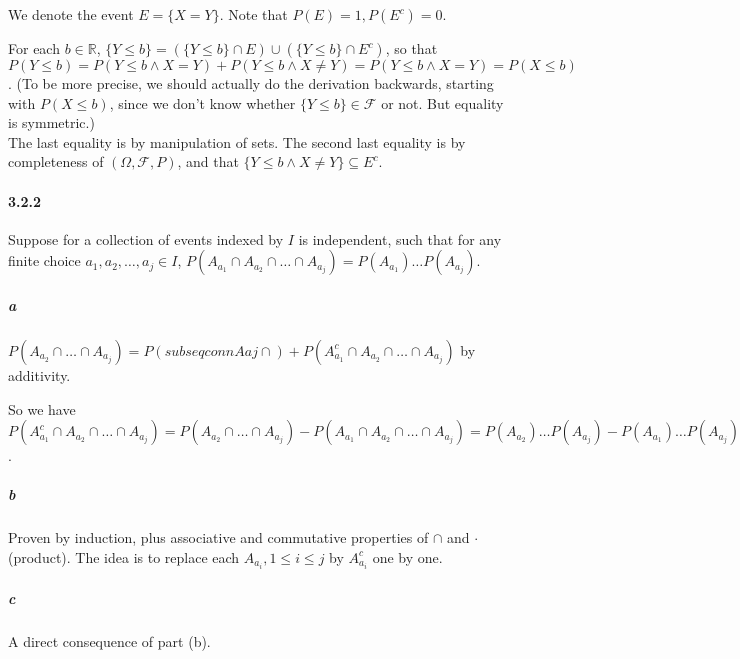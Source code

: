 \documentclass[a4paper]{article}
\newcommand{\alg}[0]{\mathcal{F}} %
\newcommand{\triple}[0]{(\Omega, \alg, P)} %
\newcommand{\real}[0]{\mathbb{R}} %
\newcommand{\seq}[2]{#1_1,#1_2,\dots,#1_{#2}} %
\newcommand{\subseqconn}[4]{#1_{#2_1} #4 #1_{#2_2} #4 \dots #4 #1_{#2_{#3}}} %
\begin{document}
We denote the event $E=\{X=Y\}$. Note that $P(E) = 1, P(E^c) = 0$.

For each $b\in\real$, $\{Y\leq b\} = (\{Y\leq b\}\cap E) \cup (\{Y\leq b\}\cap E^c)$, so that $P(Y\leq b) = P(Y\leq b\land X=Y) + P(Y\leq b\land X\neq Y) = P(Y\leq b\land X=Y) = P(X\leq b)$. (To be more precise, we should actually do the derivation backwards, starting with $P(X\leq b)$, since we don't know whether $\{Y\leq b\}\in \alg$ or not. But equality is symmetric.)\\
The last equality is by manipulation of sets. The second last equality is by completeness of $\triple$, and that $\{Y\leq b\land X\neq Y\}\subseteq E^c$.

\paragraph{3.2.2} Suppose for a collection of events indexed by $I$ is independent, such that for any finite choice $\seq{a}{j}\in I$, $P(\subseqconn{A}{a}{j}{\cap})=P(A_{a_1})\dots P(A_{a_j})$.

\subparagraph{a} $P(A_{a_2}\cap\dots\cap A_{a_j}) = P(subseqconn{A}{a}{j}{\cap}) + P(A_{a_1}^c\cap A_{a_2}\cap\dots\cap A_{a_j})$ by additivity.

So we have $P(A_{a_1}^c\cap A_{a_2}\cap\dots\cap A_{a_j}) = P(A_{a_2}\cap\dots\cap A_{a_j}) - P(\subseqconn{A}{a}{j}{\cap}) = P(A_{a_2})\dots P(A_{a_j}) - P(A_{a_1})\dots P(A_{a_j}) = (1-P(A_{a_1})P(A_{a_2})\dots P(A_{a_j}) = P(A_{a_1}^c)P(A_{a_2})\dots P(A_{a_j})$.

\subparagraph{b} Proven by induction, plus associative and commutative properties of $\cap$ and $\cdot$ (product). The idea is to replace each $A_{a_i}, 1\leq i\leq j$ by $A_{a_i}^c$ one by one.

\subparagraph{c} A direct consequence of part (b).
\end{document}
